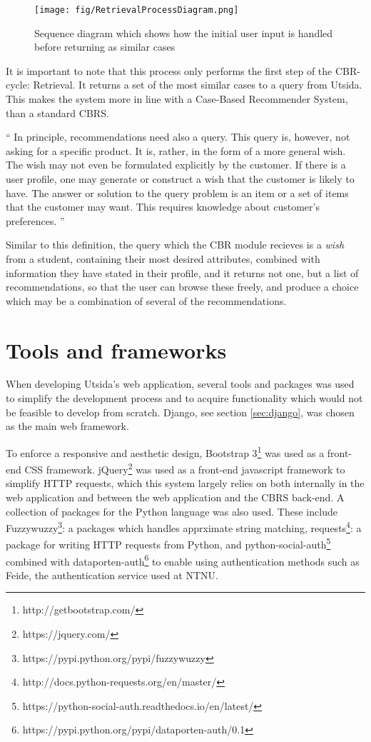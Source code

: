 \begin{figure}[h]
    \label{fig:retrieval_process_diagram}
    \centering
    \texttt{[image: fig/RetrievalProcessDiagram.png]}
    \caption{Sequence diagram which shows how the initial user input is handled before returning as similar cases}
\end{figure}

It is important to note that this process only performs the first step of the CBR-cycle: Retrieval. It returns a set of the most similar cases to a query from Utsida. This makes the system more in line with a Case-Based Recommender System, than a standard CBRS. 

\begin{displayquote}\enquote{
In principle, recommendations need also a query. This query is, however, not asking
for a specific product. It is, rather, in the form of a more general wish. The wish may
not even be formulated explicitly by the customer. If there is a user profile, one may
generate or construct a wish that the customer is likely to have.
The answer or solution to the query problem is an item or a set of items that the
customer may want. This requires knowledge about customer’s preferences.\cite{richter2013case}
}\end{displayquote}

Similar to this definition, the query which the CBR module recieves is a \emph{wish} from a student, containing their most desired attributes, combined with information they have stated in their profile, and it returns not one, but a list of recommendations, so that the user can browse these freely, and produce a choice which may be a combination of several of the recommendations.


\section{Tools and frameworks}
When developing Utsida's web application, several tools and packages was used to simplify the development process and to acquire functionality which would not be feasible to develop from scratch. Django, see section \ref{sec:django}, was chosen as the main web framework.

To enforce a responsive and aesthetic design, Bootstrap 3\footnote{http://getbootstrap.com/} was used as a front-end CSS framework. jQuery\footnote{https://jquery.com/} was used as a front-end javascript framework to simplify HTTP requests, which this system largely relies on both internally in the web application and between the web application and the CBRS back-end. A collection of packages for the Python language was also used. These include Fuzzywuzzy\footnote{https://pypi.python.org/pypi/fuzzywuzzy}: a packages which handles apprximate string matching, requests\footnote{http://docs.python-requests.org/en/master/}: a package for writing HTTP requests from Python, and python-social-auth\footnote{https://python-social-auth.readthedocs.io/en/latest/} combined with dataporten-auth\footnote{https://pypi.python.org/pypi/dataporten-auth/0.1} to enable using authentication methods such as Feide, the authentication service used at NTNU.

